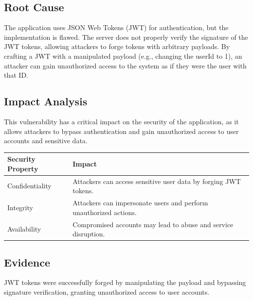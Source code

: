 \documentclass[11pt,a4paper]{report}
\begin{document}
        \vspace{0.4cm}

        \subsection{Root Cause}

        The application uses JSON Web Tokens (JWT) for authentication, but the implementation is flawed. The server does not properly verify the signature of the JWT tokens, allowing attackers to forge tokens with arbitrary payloads. By crafting a JWT with a manipulated payload (e.g., changing the userId to 1), an attacker can gain unauthorized access to the system as if they were the user with that ID.

        \vspace{0.3cm}

        \subsection{Impact Analysis}

        This vulnerability has a critical impact on the security of the application, as it allows attackers to bypass authentication and gain unauthorized access to user accounts and sensitive data.

        \begin{longtable}{|p{4cm}|p{10cm}|}
        \hline
        \rowcolor{lightgray}
        \textbf{Security Property} & \textbf{Impact} \\
        \hline
        Confidentiality & Attackers can access sensitive user data by forging JWT tokens. \\
        \hline
        Integrity & Attackers can impersonate users and perform unauthorized actions. \\
        \hline
        Availability & Compromised accounts may lead to abuse and service disruption. \\
        \hline
        \end{longtable}

        \vspace{0.3cm}

        \subsection{Evidence}

        JWT tokens were successfully forged by manipulating the payload and bypassing signature verification, granting unauthorized access to user accounts.
\end{document}
